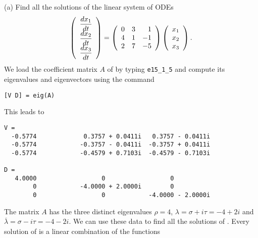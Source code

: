 \documentclass{ximera}
\begin{document}
\noindent (a)  Find all the solutions of the linear system of ODEs
\arraystart
\begin{equation*}  \label{eq:exsyslinc1}
\left(\begin{array}{c}
\displaystyle\frac{dx_1}{dt} \\ \displaystyle\frac{dx_2}{dt} \\ \displaystyle\frac{dx_3}{dt}
\end{array}\right)
=
\left(\begin{array}{rrr}
     0  &  3  &  1\\
     4  &  1  & -1\\
     2  &  7  & -5
\end{array}\right)
\left(\begin{array}{c}
x_1 \\ x_2 \\ x_3
\end{array}\right).
\end{equation*}
\arrayfinish
We load the coefficient matrix $A$ of  by typing 
{\tt e15\_1\_5} and compute its eigenvalues and eigenvectors using the 
command 
\begin{verbatim}
[V D] = eig(A)
\end{verbatim}
This leads to
\begin{verbatim}
V =
  -0.5774             0.3757 + 0.0411i   0.3757 - 0.0411i
  -0.5774            -0.3757 - 0.0411i  -0.3757 + 0.0411i
  -0.5774            -0.4579 + 0.7103i  -0.4579 - 0.7103i

D =
   4.0000                  0                  0
        0            -4.0000 + 2.0000i        0
        0                  0            -4.0000 - 2.0000i
\end{verbatim}
The matrix $A$ has the three distinct eigenvalues $\rho=4$,
$\lambda=\sigma+i\tau = -4+2i$ and $\overline\lambda=\sigma-i\tau
= -4-2i$.  We can use these data to find all the solutions of 
.  Every solution of  is a linear 
combination of the functions
\end{document}
